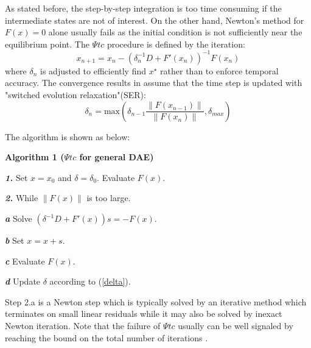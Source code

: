 \documentclass[journal]{IEEEtran}
\begin{document}
As stated before, the step-by-step integration is too time consuming if the intermediate states are not of interest. On the other hand, Newton's method for $F(x)=0$ alone usually fails as the initial condition is not sufficiently near the equilibrium point. 
The $\Psi tc$ procedure is defined by the iteration:
\begin{equation}\label{PTC}
x_{n+1}=x_n-(\delta_n^{-1}D+F'(x_n))^{-1}F(x_n)
\end{equation}
where ${\delta_n}$ is adjusted to efficiently find $x^\star$ rather than to enforce temporal accuracy. The convergence results in \cite{Kelley:article}\cite{Kelley:article2} assume that the time step is updated with "switched evolution relaxation"(SER):
\begin{equation}\label{delta}
\delta_n=\mbox{max}(\delta_{n-1}\frac{\|F(x_{n-1})\|}{\|F(x_{n})\|},\delta_{max})
\end{equation}

The algorithm is shown as below:
\begin{IEEEdescription}
\item[\textbf{Algorithm 1 ($\Psi tc$ for general DAE)}]
\item[\textbf{\textit{1.}}] Set $x=x_0$ and $\delta=\delta_0$. Evaluate $F(x)$.
\item[\textbf{\textit{2.}}] While $\|F(x)\|$ is too large.
\begin{LaTeXdescription}
\item[\textbf{\textit{a}}] Solve $(\delta^{-1}D+F'(x))s=-F(x)$.
\item[\textbf{\textit{b}}] Set $x=x+s$.
\item[\textbf{\textit{c}}] Evaluate $F(x)$.
\item[\textbf{\textit{d}}] Update $\delta$ according to (\ref{delta}).
\end{LaTeXdescription}
\end{IEEEdescription}

Step 2.a is a Newton step which is typically solved by an iterative method which terminates on small linear residuals while it may also be solved by inexact Newton iteration. Note that the failure of $\Psi tc$ usually can be well signaled by reaching the bound on the total number of iterations \cite{Kelley:article}.
\end{document}
